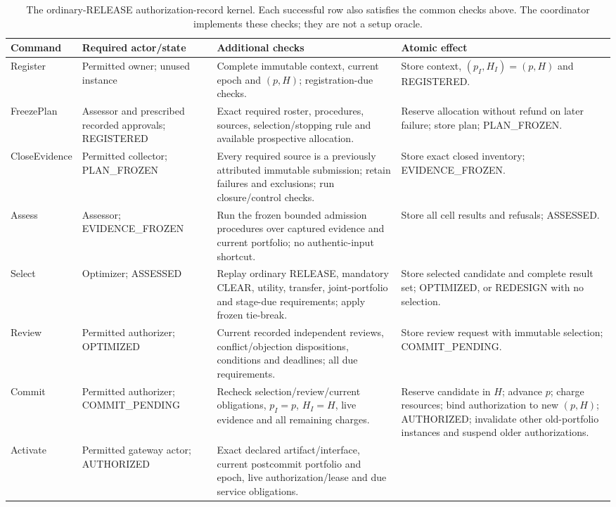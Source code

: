 \begin{table}[tp]
\centering\normalsize
\caption{The ordinary-RELEASE authorization-record kernel.
Each successful row also satisfies the common checks above.
The coordinator implements these checks; they are not a setup oracle.}
\label{tab:uc-kernel}
\begin{tabularx}{\textwidth}{@{}p{}p{}XX@{}}
\toprule
Command & Required actor/state & Additional checks & Atomic effect \\
\midrule
Register & Permitted owner; unused instance &
Complete immutable context, current epoch and $(p,H)$; registration-due checks. &
Store context, $(p_I,H_I)=(p,H)$ and REGISTERED. \\
FreezePlan & Assessor and prescribed recorded approvals; REGISTERED &
Exact required roster, procedures, sources, selection/stopping rule and available prospective allocation. &
Reserve allocation without refund on later failure; store plan; PLAN\_FROZEN. \\
CloseEvidence & Permitted collector; PLAN\_FROZEN &
Every required source is a previously attributed immutable submission; retain failures and exclusions; run closure/control checks. &
Store exact closed inventory; EVIDENCE\_FROZEN. \\
Assess & Assessor; EVIDENCE\_FROZEN &
Run the frozen bounded admission procedures over captured evidence and current portfolio; no authentic-input shortcut. &
Store all cell results and refusals; ASSESSED. \\
Select & Optimizer; ASSESSED &
Replay ordinary RELEASE, mandatory CLEAR, utility, transfer, joint-portfolio and stage-due requirements; apply frozen tie-break. &
Store selected candidate and complete result set; OPTIMIZED, or REDESIGN with no selection. \\
Review & Permitted authorizer; OPTIMIZED &
Current recorded independent reviews, conflict/objection dispositions, conditions and deadlines; all due requirements. &
Store review request with immutable selection; COMMIT\_PENDING. \\
Commit & Permitted authorizer; COMMIT\_PENDING &
Recheck selection/review/current obligations, $p_I=p$, $H_I=H$, live evidence and all remaining charges. &
Reserve candidate in $H$; advance $p$; charge resources; bind authorization to new $(p,H)$; AUTHORIZED; invalidate other old-portfolio instances and suspend older authorizations. \\
Activate & Permitted gateway actor; AUTHORIZED &
Exact declared artifact/interface, current postcommit portfolio and epoch, live authorization/lease and due service obligations. &

\end{tabularx}
\end{table}
